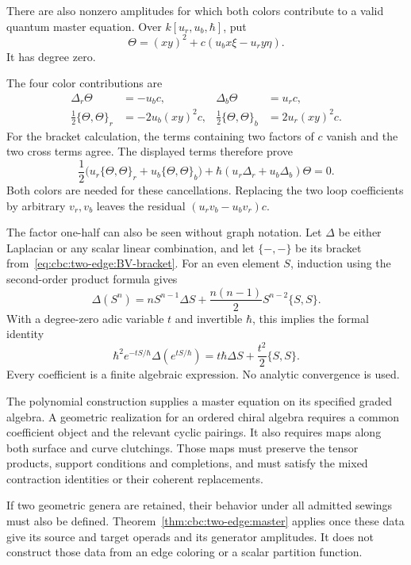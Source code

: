 There are also nonzero amplitudes for which both colors contribute to a valid quantum master equation.
Over $k[u_r,u_b,\hbar]$, put
\[
 \Theta=(xy)^2+c(u_bx\xi-u_ry\eta).
\]
It has degree zero.

The four color contributions are
\begin{align*}
 \Delta_r\Theta&=-u_bc,&
 \Delta_b\Theta&=u_rc,\\
 \tfrac12\{\Theta,\Theta\}_r&=-2u_b(xy)^2c,&
 \tfrac12\{\Theta,\Theta\}_b&=2u_r(xy)^2c.
\end{align*}
For the bracket calculation, the terms containing two factors of $c$ vanish and the two cross terms agree.
The displayed terms therefore prove
\begin{equation}\label{eq:cbc:two-edge:polynomial-solution}
 \frac12\bigl(u_r\{\Theta,\Theta\}_r+u_b\{\Theta,\Theta\}_b\bigr)
 +\hbar(u_r\Delta_r+u_b\Delta_b)\Theta=0.
\end{equation}
Both colors are needed for these cancellations.
Replacing the two loop coefficients by arbitrary $v_r,v_b$ leaves the residual $(u_rv_b-u_bv_r)c$.

The factor one-half can also be seen without graph notation.
Let $\Delta$ be either Laplacian or any scalar linear combination, and let $\{-,-\}$ be its bracket from~\eqref{eq:cbc:two-edge:BV-bracket}.
For an even element $S$, induction using the second-order product formula gives
\[
 \Delta(S^n)=nS^{n-1}\Delta S
       +\frac{n(n-1)}2S^{n-2}\{S,S\}.
\]
With a degree-zero adic variable $t$ and invertible $\hbar$, this implies the formal identity
\[
 \hbar^2e^{-tS/\hbar}\Delta(e^{tS/\hbar})
 =t\hbar\Delta S+\frac{t^2}{2}\{S,S\}.
\]
Every coefficient is a finite algebraic expression.
No analytic convergence is used.

The polynomial construction supplies a master equation on its specified graded algebra.
A geometric realization for an ordered chiral algebra requires a common coefficient object and the relevant cyclic pairings.
It also requires maps along both surface and curve clutchings.
Those maps must preserve the tensor products, support conditions and completions, and must satisfy the mixed contraction identities or their coherent replacements.

If two geometric genera are retained, their behavior under all admitted sewings must also be defined.
Theorem~\ref{thm:cbc:two-edge:master} applies once these data give its source and target operads and its generator amplitudes.
It does not construct those data from an edge coloring or a scalar partition function.

